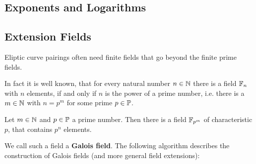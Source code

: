 \subsection{Exponents and Logarithms}

\subsection{Extension Fields}

Eliptic curve pairings often need finite fields that go beyond the finite prime fields. 

In fact it is well known, that for every natural number $n\in\mathbb{N}$ there is a field $\mathbb{F}_n$ with $n$ elements, if and only if $n$ is the power of a prime number, i.e. there is a $m\in\mathbb{N}$ with $n=p^m$ for some prime $p\in\mathbb{P}$.
\begin{theorem}
Let $m\in\mathbb{N}$ and $p\in\mathbb{P}$ a prime number. Then there is a field $\mathbb{F}_{p^m}$ of characteristic $p$, that contains $p^n$ elements.  
\end{theorem}
We call such a field a \textbf{Galois field}. The following algorithm describes the construction of Galois fields (and more general field extensions):

